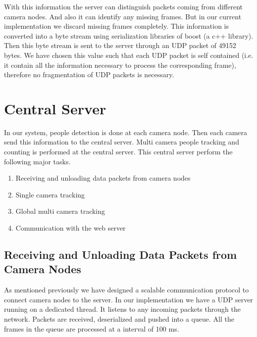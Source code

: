 \documentclass[12pt,a4paper]{report}
\begin{document}
With this information the server can distinguish packets coming from different camera nodes. And also it can identify any missing frames. But in our current implementation we discard missing frames completely. This information is converted into a byte stream using serialization libraries of boost (a c++ library). Then this byte stream is sent to the server through an UDP packet of 49152 bytes. We have chosen this value such that each UDP packet is self contained (i.e. it contain all the information necessary to process the corresponding frame), therefore no fragmentation of UDP packets is necessary.

\section{Central Server}
In our system, people detection is done at each camera node. Then each camera send this information to the central server. Multi camera people tracking and counting is performed at the central server. This central server perform the following major tasks.
\begin{enumerate}
\item Receiving and unloading data packets from camera nodes
\item Single camera tracking
\item Global multi camera tracking
\item Communication with the web server
\end{enumerate}

\subsection{Receiving and Unloading Data Packets from Camera Nodes}
As mentioned previously we have designed a scalable communication protocol to connect camera nodes to the server. In our implementation we have a UDP server running on a dedicated thread. It listens to any incoming packets through the network. Packets are received, deserialized and pushed into a queue. All the frames in the queue are processed at a interval of 100 ms.
\end{document}
